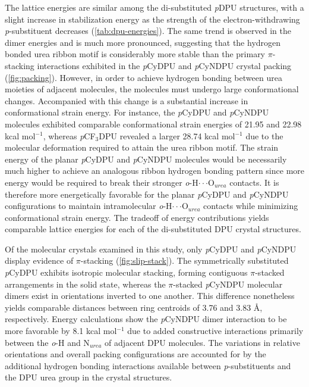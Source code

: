 The lattice energies are similar among the di-substituted \textit{p}DPU structures, with a slight increase in stabilization energy as the strength of the electron-withdrawing \textit{p}-substituent decreases (\autoref{tab:dpu-energies}). The same trend is observed in the dimer energies and is much more pronounced, suggesting that the hydrogen bonded urea ribbon motif is considerably more stable than the primary $\pi$-stacking interactions exhibited in the \textit{p}CyDPU and \textit{p}CyNDPU crystal packing (\autoref{fig:packing}). However, in order to achieve hydrogen bonding between urea moieties of adjacent molecules, the molecules must undergo large conformational changes. Accompanied with this change is a substantial increase in conformational strain energy. For instance, the \textit{p}CyDPU and \textit{p}CyNDPU molecules exhibited comparable conformational strain energies of 21.95 and 22.98 kcal mol$^{-1}$, whereas \textit{p}CF$_{3}$DPU revealed a larger 28.74 kcal mol$^{-1}$ due to the molecular deformation required to attain the urea ribbon motif. The strain energy of the planar \textit{p}CyDPU and \textit{p}CyNDPU molecules would be necessarily much higher to achieve an analogous ribbon hydrogen bonding pattern since more energy would be required to break their stronger \textit{o}-H$\cdot \cdot \cdot$O$_{urea}$ contacts. It is therefore more energetically favorable for the planar \textit{p}CyDPU and \textit{p}CyNDPU configurations to maintain intramolecular \textit{o}-H$\cdot \cdot \cdot$O$_{urea}$ contacts while minimizing conformational strain energy. The tradeoff of energy contributions yields comparable lattice energies for each of the di-substituted DPU crystal structures. 

Of the molecular crystals examined in this study, only \textit{p}CyDPU and \textit{p}CyNDPU display evidence of $\pi$-stacking (\autoref{fig:slip-stack}). The symmetrically substituted \textit{p}CyDPU exhibits isotropic molecular stacking, forming contiguous $\pi$-stacked arrangements in the solid state, whereas the $\pi$-stacked \textit{p}CyNDPU molecular dimers exist in orientations inverted to one another. This difference nonetheless yields comparable distances between ring centroids of 3.76 and 3.83 \AA, respectively. Energy calculations show the \textit{p}CyNDPU dimer interaction to be more favorable by 8.1 kcal mol$^{-1}$ due to added constructive interactions primarily between the \textit{o}-H and N$_{urea}$ of adjacent DPU molecules. The variations in relative orientations and overall packing configurations are accounted for by the additional hydrogen bonding interactions available between \textit{p}-substituents and the DPU urea group in the crystal structures. 


